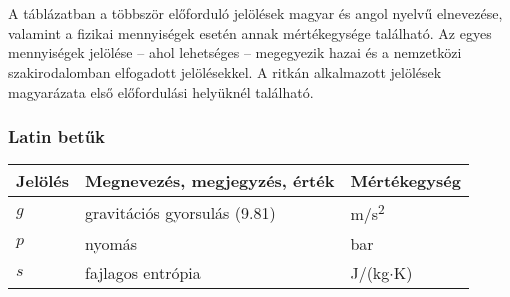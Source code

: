 \newcommand{\tss}{\textsuperscript}     %
\chapter*{\jelolesek}

A táblázatban a többször előforduló jelölések magyar és angol nyelvű elnevezése, 
valamint a fizikai mennyiségek esetén annak mértékegysége található. Az egyes 
mennyiségek jelölése – ahol lehetséges – megegyezik hazai és a nemzetközi 
szakirodalomban elfogadott jelölésekkel. A ritkán alkalmazott jelölések 
magyarázata első előfordulási helyüknél található.



\def\arraystretch{1.5}%

\subsection*{Latin betűk}
\begin{center}
    \begin{tabular}{lp{10cm}l}
        \hline
        \large{Jelölés} & \large{Megnevezés, megjegyzés, érték} & \large{Mértékegység} \\ 
        \hline
        $g$     & gravitációs gyorsulás (9.81)  & m/s\tss{2}     \\
        $p$     & nyomás                        & bar           \\
        $s$     & fajlagos entrópia             & J/(kg$\cdot$K)\\
        \hline
    \end{tabular}    
\end{center}



